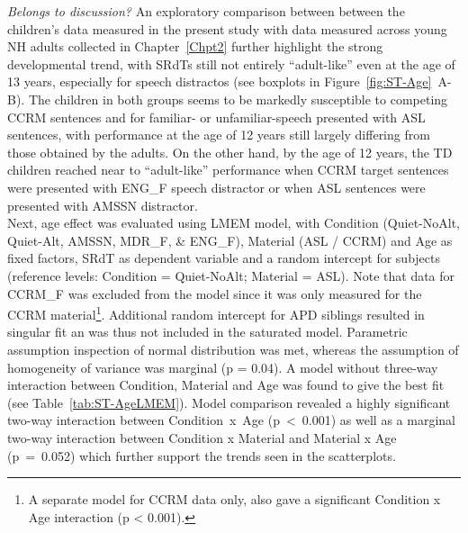 \documentclass[a4paper, twoside]{templates/ociamthesis}
\begin{document}
\colorbox[HTML]{CCCCFF}{\emph{Belongs to discussion?}}
An exploratory comparison between between the children's data measured in the present study with data measured across young NH adults collected in Chapter~\ref{Chpt2} further highlight the strong developmental trend, with SRdTs still not entirely ``adult-like'' even at the age of 13 years, especially for speech distractos (see boxplots in Figure~\ref{fig:ST-Age}~A-B). The children in both groups seems to be markedly susceptible to competing CCRM sentences and for familiar- or unfamiliar-speech presented with ASL sentences, with performance at the age of 12 years still largely differing from those obtained by the adults. On the other hand, by the age of 12 years, the TD children reached near to ``adult-like'' performance when CCRM target sentences were presented with ENG\_F speech distractor or when ASL sentences were presented with AMSSN distractor.\\

Next, age effect was evaluated using LMEM model, with Condition (Quiet-NoAlt, Quiet-Alt, AMSSN, MDR\_F, \& ENG\_F), Material (ASL / CCRM) and Age as fixed factors, SRdT as dependent variable and a random intercept for subjects (reference levels: Condition = Quiet-NoAlt; Material = ASL). Note that data for CCRM\_F was excluded from the model since it was only measured for the CCRM material\footnote{A separate model for CCRM data only, also gave a significant Condition x Age interaction (p \textless{} 0.001).}. Additional random intercept for APD siblings resulted in singular fit an was thus not included in the saturated model. Parametric assumption inspection of normal distribution was met, whereas the assumption of homogeneity of variance was marginal (p = 0.04). A model without three-way interaction between Condition, Material and Age was found to give the best fit (see Table~\ref{tab:ST-AgeLMEM}). Model comparison revealed a highly significant two-way interaction between Condition~x~Age (p~\textless~0.001) as well as a marginal two-way interaction between Condition x Material and Material x Age (p~=~0.052) which further support the trends seen in the scatterplots.
\end{document}
